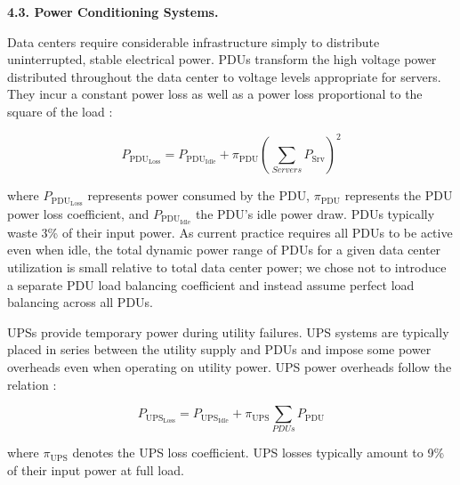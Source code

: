 {\bf 4.3. Power Conditioning Systems.} 

Data centers require considerable infrastructure simply to distribute uninterrupted, stable electrical power.  PDUs transform the high voltage power distributed throughout the data center to voltage levels appropriate for servers. They incur a constant power loss as well as a power loss proportional to the square of the load \cite{Rasmussen113}:

\begin{equation}
P_{\mathrm{PDU}_{\mathrm{Loss}}} = P_{\mathrm{PDU}_{\mathrm{Idle}}} + \pi_{\mathrm{PDU}}(\sum_{Servers}P_{\mathrm{Srv}})^{2}
\end{equation}

where $P_{\mathrm{PDU}_{\mathrm{Loss}}}$ represents power consumed by the PDU, $\pi_{\mathrm{PDU}}$ represents the PDU power loss coefficient, and $P_{\mathrm{PDU}_{\mathrm{Idle}}}$ the PDU's idle power draw. PDUs typically waste 3\% of their input power.
As current practice requires all PDUs to be active even when idle, the total dynamic power range of PDUs for a given data center utilization is small relative to total data center power; we chose not to introduce a separate PDU load balancing coefficient and instead assume perfect load balancing across all PDUs.

UPSs provide temporary power during utility failures.  UPS systems are typically placed in series between the utility supply and PDUs and impose some power overheads even when operating on utility power.  UPS power overheads follow the relation \cite{Rasmussen113}:

\begin{equation}
P_{\mathrm{UPS}_{\mathrm{Loss}}} = P_{\mathrm{UPS}_{\mathrm{Idle}}} + \pi_{\mathrm{UPS}}\sum_{PDUs}P_{\mathrm{PDU}}
\end{equation}

where $\pi_{\mathrm{UPS}}$ denotes the UPS loss coefficient.  UPS losses typically amount to 9\% of their input power at full load.


%


